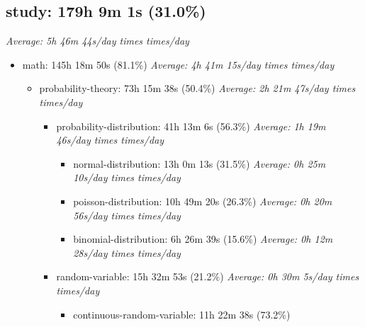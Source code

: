 \documentclass[12pt]{extarticle}
\begin{document}
{\fontsize{16}{19.2}\selectfont\subsection*{study: 179h 9m 1s (31.0\%)}}
\textit{Average: 5h 46m 44s/day  times  times/day}\par
\begin{itemize}[topsep=0pt, itemsep=-0.5ex]
    \item math: 145h 18m 50s (81.1\%)
        \textit{Average: 4h 41m 15s/day  times  times/day}\par
\begin{itemize}[topsep=0pt, itemsep=-0.5ex]
    \item probability-theory: 73h 15m 38s (50.4\%)
        \textit{Average: 2h 21m 47s/day  times  times/day}\par
\begin{itemize}[topsep=0pt, itemsep=-0.5ex]
    \item probability-distribution: 41h 13m 6s (56.3\%)
        \textit{Average: 1h 19m 46s/day  times  times/day}\par
\begin{itemize}[topsep=0pt, itemsep=-0.5ex]
    \item normal-distribution: 13h 0m 13s (31.5\%)
        \textit{Average: 0h 25m 10s/day  times  times/day}\par
    \item poisson-distribution: 10h 49m 20s (26.3\%)
        \textit{Average: 0h 20m 56s/day  times  times/day}\par
    \item binomial-distribution: 6h 26m 39s (15.6\%)
        \textit{Average: 0h 12m 28s/day  times  times/day}\par
\end{itemize}
    \item random-variable: 15h 32m 53s (21.2\%)
        \textit{Average: 0h 30m 5s/day  times  times/day}\par
\begin{itemize}[topsep=0pt, itemsep=-0.5ex]
    \item continuous-random-variable: 11h 22m 38s (73.2\%)

\end{itemize}
\end{itemize}
\end{itemize}
\end{itemize}
\end{document}

